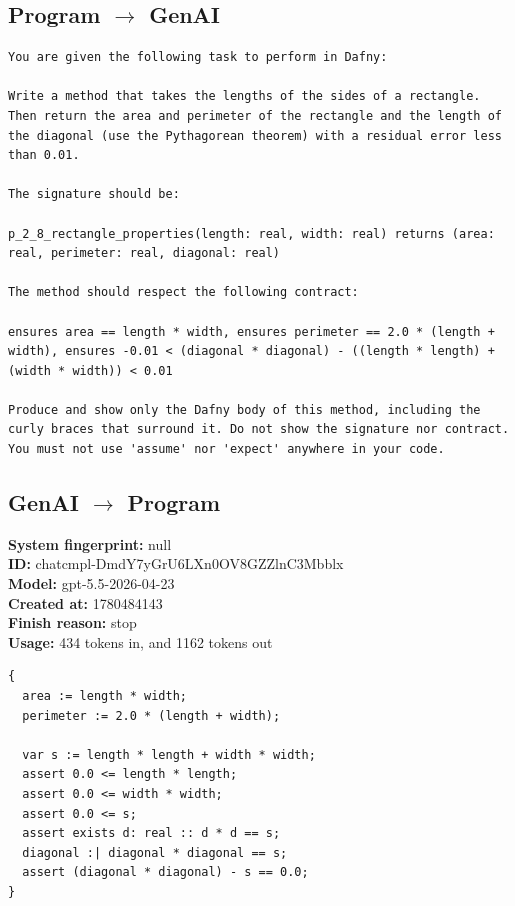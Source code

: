 \documentclass{article}
\begin{document}
\subsection*{Program $\rightarrow$ GenAI}
\begin{lstlisting}
You are given the following task to perform in Dafny:

Write a method that takes the lengths of the sides of a rectangle. Then return the area and perimeter of the rectangle and the length of the diagonal (use the Pythagorean theorem) with a residual error less than 0.01.

The signature should be:

p_2_8_rectangle_properties(length: real, width: real) returns (area: real, perimeter: real, diagonal: real)

The method should respect the following contract:

ensures area == length * width, ensures perimeter == 2.0 * (length + width), ensures -0.01 < (diagonal * diagonal) - ((length * length) + (width * width)) < 0.01

Produce and show only the Dafny body of this method, including the curly braces that surround it. Do not show the signature nor contract. You must not use 'assume' nor 'expect' anywhere in your code.
\end{lstlisting}
\subsection*{GenAI $\rightarrow$ Program}
\textbf{System fingerprint: }null
\\\textbf{ID: }chatcmpl-DmdY7yGrU6LXn0OV8GZZlnC3Mbblx
\\\textbf{Model: }gpt-5.5-2026-04-23
\\\textbf{Created at: }1780484143
\\\textbf{Finish reason: }stop
\\\textbf{Usage: }434 tokens in, and 1162 tokens out
\begin{lstlisting}
{
  area := length * width;
  perimeter := 2.0 * (length + width);

  var s := length * length + width * width;
  assert 0.0 <= length * length;
  assert 0.0 <= width * width;
  assert 0.0 <= s;
  assert exists d: real :: d * d == s;
  diagonal :| diagonal * diagonal == s;
  assert (diagonal * diagonal) - s == 0.0;
}
\end{lstlisting}
\end{document}
